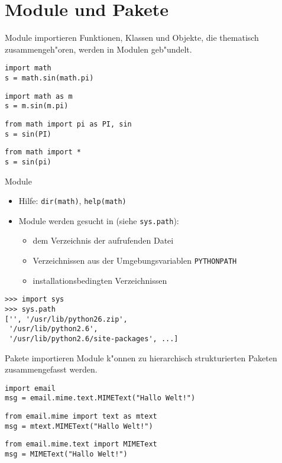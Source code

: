 \section{Module und Pakete}

\begin{frame}[fragile]{Module importieren}
Funktionen, Klassen und Objekte, die thematisch zusammengeh"oren, werden in Modulen geb"undelt.
\begin{lstlisting}[style=Python]
import math
s = math.sin(math.pi)
\end{lstlisting}
\begin{lstlisting}[style=Python]
import math as m
s = m.sin(m.pi)
\end{lstlisting}
\begin{lstlisting}[style=Python]
from math import pi as PI, sin
s = sin(PI)
\end{lstlisting}
\begin{lstlisting}[style=Python]
from math import *
s = sin(pi)
\end{lstlisting}
\end{frame}

\begin{frame}[fragile]{Module}
\begin{itemize}
\item Hilfe: \lstinline{dir(math)}, \lstinline{help(math)}
\item Module werden gesucht in (siehe \lstinline{sys.path}):
\begin{itemize}
\item dem Verzeichnis der aufrufenden Datei
\item Verzeichnissen aus der Umgebungsvariablen \texttt{PYTHONPATH}
\item installationsbedingten Verzeichnissen 
\end{itemize}
\end{itemize}
\begin{lstlisting}[style=Shell]
>>> import sys
>>> sys.path
['', '/usr/lib/python26.zip',
 '/usr/lib/python2.6', 
 '/usr/lib/python2.6/site-packages', ...]
\end{lstlisting}
\end{frame}

\begin{frame}[fragile]{Pakete importieren}
Module k"onnen zu  hierarchisch strukturierten Paketen zusammengefasst werden.
\begin{lstlisting}[style=Python]
import email
msg = email.mime.text.MIMEText("Hallo Welt!")
\end{lstlisting}
\begin{lstlisting}[style=Python]
from email.mime import text as mtext
msg = mtext.MIMEText("Hallo Welt!")
\end{lstlisting}
\begin{lstlisting}[style=Python]
from email.mime.text import MIMEText
msg = MIMEText("Hallo Welt!")
\end{lstlisting}
\end{frame}

